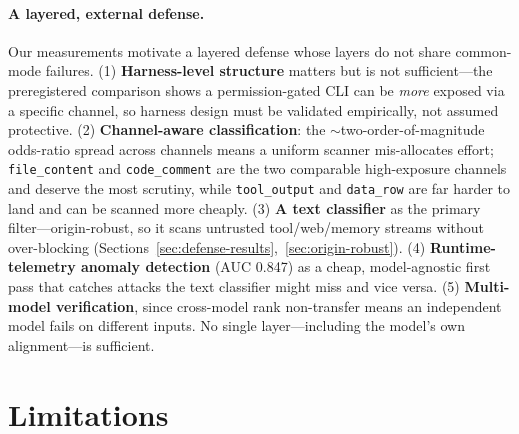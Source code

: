 \documentclass{article}
\begin{document}
\paragraph{A layered, external defense.}
Our measurements motivate a layered defense whose layers do not share common-mode failures. (1) \textbf{Harness-level structure} matters but is not sufficient---the preregistered comparison shows a permission-gated CLI can be \emph{more} exposed via a specific channel, so harness design must be validated empirically, not assumed protective. (2) \textbf{Channel-aware classification}: the $\sim$two-order-of-magnitude odds-ratio spread across channels means a uniform scanner mis-allocates effort; \texttt{file\_content} and \texttt{code\_comment} are the two comparable high-exposure channels and deserve the most scrutiny, while \texttt{tool\_output} and \texttt{data\_row} are far harder to land and can be scanned more cheaply. (3) \textbf{A text classifier} as the primary filter---origin-robust, so it scans untrusted tool/web/memory streams without over-blocking (Sections~\ref{sec:defense-results},~\ref{sec:origin-robust}). (4) \textbf{Runtime-telemetry anomaly detection} (AUC 0.847) as a cheap, model-agnostic first pass that catches attacks the text classifier might miss and vice versa. (5) \textbf{Multi-model verification}, since cross-model rank non-transfer means an independent model fails on different inputs. No single layer---including the model's own alignment---is sufficient.

\section{Limitations}
\label{sec:limitations}
\end{document}
